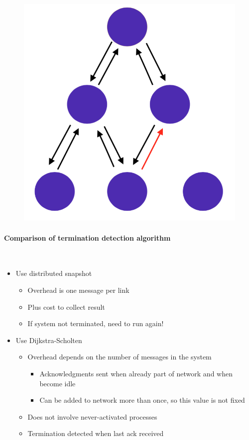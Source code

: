 \documentclass[10pt,a4paper]{article}
\newcommand{\myparagraph}[1]{\paragraph{#1}\mbox{}\\[0.05in]}
\begin{document}
\begin{figure}[h!]
\begin{minipage}{.3\textwidth}
  \includegraphics[width=.8\linewidth]{images/di-sch9.png}
  \label{fig:di-sch9}
\end{minipage}
\end{figure} 
\myparagraph{Comparison of termination detection algorithm}
\begin{itemize}
	\item Use distributed snapshot
	\begin{itemize}
		\item Overhead is one message per link
		\item Plus cost to collect result
		\item If system not terminated, need to run again!
	\end{itemize}
	\item Use Dijkstra-Scholten
	\begin{itemize}
		\item Overhead depends on the number of messages in the system
		\begin{itemize}
			\item Acknowledgments sent when already part of network and when become idle
			\item Can be added to network more than once, so this value is not fixed
		\end{itemize}
		\item Does not involve never-activated processes
		\item Termination detected when last ack received
	\end{itemize}
\end{itemize}
\end{document}
